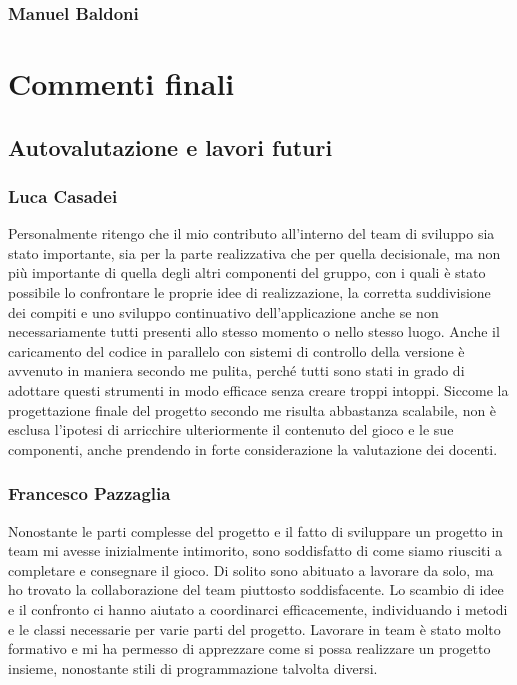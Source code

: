 \documentclass[a4paper,12pt]{report}
\begin{document}
\subsection{Manuel Baldoni}

\chapter{Commenti finali}

\section{Autovalutazione e lavori futuri}

\subsection{Luca Casadei}
Personalmente ritengo che il mio contributo all'interno del team di sviluppo sia stato importante, sia per la parte realizzativa che per quella decisionale, ma non più importante di quella degli altri componenti del gruppo, con i quali è stato possibile lo confrontare le proprie idee di realizzazione, la corretta suddivisione dei compiti e uno sviluppo continuativo dell'applicazione anche se non necessariamente tutti presenti allo stesso momento o nello stesso luogo. Anche il caricamento del codice in parallelo con sistemi di controllo della versione è avvenuto in maniera secondo me pulita, perché tutti sono stati in grado di adottare questi strumenti in modo efficace senza creare troppi intoppi. Siccome la progettazione finale del progetto secondo me risulta abbastanza scalabile, non è esclusa l'ipotesi di arricchire ulteriormente il contenuto del gioco e le sue componenti, anche prendendo in forte considerazione la valutazione dei docenti.

\subsection{Francesco Pazzaglia}

Nonostante le parti complesse del progetto e il fatto di sviluppare un progetto in team mi avesse inizialmente intimorito, sono soddisfatto di come siamo riusciti a completare e consegnare il gioco. Di solito sono abituato a lavorare da solo, ma ho trovato la collaborazione del team piuttosto soddisfacente. Lo scambio di idee e il confronto ci hanno aiutato a coordinarci efficacemente, individuando i metodi e le classi necessarie per varie parti del progetto. Lavorare in team è stato molto formativo e mi ha permesso di apprezzare come si possa realizzare un progetto insieme, nonostante stili di programmazione talvolta diversi.
\end{document}
